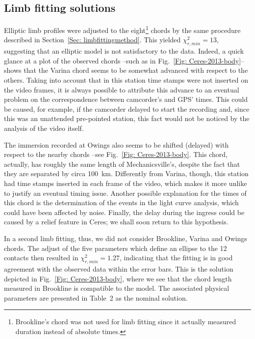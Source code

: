 \documentclass[useAMS,usenatbib]{mn2e}
\begin{document}
\subsection{Limb fitting solutions}

Elliptic limb profiles were adjusted to the eight\footnote{Brookline's chord was not used for limb fitting since it actually measured duration instead of absolute times.} chords by the same procedure described in Section~\ref{Sec: limbfittingmethod}. This yielded $\chi^2_{r,min} = 13$, suggesting that an elliptic model is not satisfactory to the data. Indeed, a quick glance at a plot of the observed chords --such as in Fig.~\ref{Fig: Ceres-2013-body}-- shows that the Varina chord seems to be somewhat advanced with respect to the others. Taking into account that in this station time stamps were not inserted on the video frames, it is always possible to attribute this advance to an eventual problem on the correspondence between camcorder's and GPS' times. This could be caused, for example, if the camcorder delayed to start the recording and, since this was an unattended pre-pointed station, this fact would not be noticed by the analysis of the video itself.

The immersion recorded at Owings also seems to be shifted (delayed) with respect to the nearby chords --see Fig.~\ref{Fig: Ceres-2013-body}. This chord, actually, has roughly the same length of Mechanicsville's, despite the fact that they are separated by circa 100~km. Differently from Varina, though, this station had time stamps inserted in each frame of the video, which makes it more unlike to justify an eventual timing issue. Another possible explanation for the times of this chord is the determination of the events in the light curve analysis, which could have been affected by noise. Finally, the delay during the ingress could be caused by a relief feature in Ceres; we shall soon return to this hypothesis.


In a second limb fitting, thus, we did not consider Brookline, Varina and Owings chords. The adjust of the five parameters which define an ellipse to the 12 contacts then resulted in $\chi^2_{r,min} = 1.27$, indicating that the fitting is in good agreement with the observed data within the error bars. This is the solution depicted in Fig.~\ref{Fig: Ceres-2013-body}, where we see that the chord length measured in Brookline is compatible to the model. The associated physical parameters are presented in Table~2 as the nominal solution.
\end{document}
